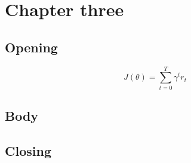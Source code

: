\chapter{Chapter three}
\section{Opening}
\lipsum[1-40]
\begin{equation}
  J(\theta) = \sum_{t=0}^{T} \gamma^t r_t
\end{equation}
\section{Body}
\lipsum[41-80]
\section{Closing}
\lipsum[81-110]
